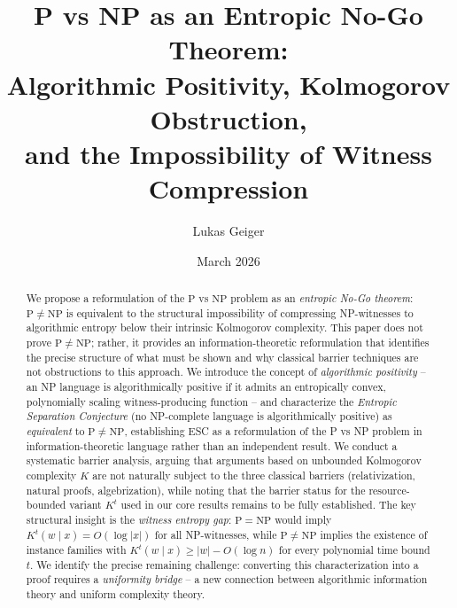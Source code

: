 \documentclass[aps,prd,twocolumn,superscriptaddress,nofootinbib]{revtex4-2}
\theoremstyle{definition}
\theoremstyle{remark}
\newcommand{\NP}{\mathrm{NP}}
\newcommand{\PP}{\mathrm{P}}
\begin{document}

\title{P vs NP as an Entropic No-Go Theorem:\\Algorithmic Positivity, Kolmogorov Obstruction,\\and the Impossibility of Witness Compression}

\author{Lukas Geiger}

\date{March 2026}

\begin{abstract}
We propose a reformulation of the $\PP$ vs $\NP$ problem as an \textit{entropic No-Go theorem}: $\PP \neq \NP$ is equivalent to the structural impossibility of compressing NP-witnesses to algorithmic entropy below their intrinsic Kolmogorov complexity. This paper does not prove $\PP \neq \NP$; rather, it provides an information-theoretic reformulation that identifies the precise structure of what must be shown and why classical barrier techniques are not obstructions to this approach. We introduce the concept of \textit{algorithmic positivity} -- an NP language is algorithmically positive if it admits an entropically convex, polynomially scaling witness-producing function -- and characterize the \textit{Entropic Separation Conjecture} (no NP-complete language is algorithmically positive) as \textit{equivalent} to $\PP \neq \NP$, establishing ESC as a reformulation of the P vs NP problem in information-theoretic language rather than an independent result. We conduct a systematic barrier analysis, arguing that arguments based on unbounded Kolmogorov complexity $K$ are not naturally subject to the three classical barriers (relativization, natural proofs, algebrization), while noting that the barrier status for the resource-bounded variant $K^t$ used in our core results remains to be fully established. The key structural insight is the \textit{witness entropy gap}: $\PP = \NP$ would imply $K^t(w \mid x) = O(\log|x|)$ for all NP-witnesses, while $\PP \neq \NP$ implies the existence of instance families with $K^t(w \mid x) \geq |w| - O(\log n)$ for every polynomial time bound $t$. We identify the precise remaining challenge: converting this characterization into a proof requires a \textit{uniformity bridge} -- a new connection between algorithmic information theory and uniform complexity theory.
\end{abstract}
\end{document}
